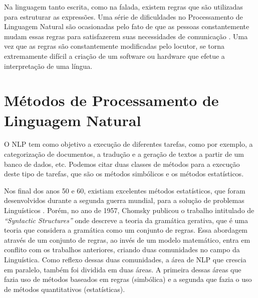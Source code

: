 Na linguagem tanto escrita, como na falada, existem regras que são utilizadas
para estruturar as expressões. Uma série de dificuldades no Processamento de
Linguagem Natural são ocasionadas pelo fato de que as pessoas constantemente
mudam essas regras para satisfazerem suas necessidades de comunicação
\cite{manningschutze1999}. Uma vez que as regras são constantemente modificadas
pelo locutor, se torna extremamente difícil a criação de um software ou hardware
que efetue a interpretação de uma língua.


%
%
%

\section{Métodos de Processamento de Linguagem Natural}

O \ac{NLP} tem como objetivo a execução de diferentes tarefas, como por exemplo,
a categorização de documentos, a tradução e a geração de textos a partir de um
banco de dados, etc. Podemos citar duas classes de métodos para a execução deste
tipo de tarefas, que são os métodos simbólicos e os métodos estatísticos.

Nos final dos anos 50 e 60, existiam excelentes métodos estatísticos, que foram
desenvolvidos durante a segunda guerra mundial, para a solução de problemas
Linguísticos \cite{shannon48}.
Porém, no ano de 1957, Chomsky publicou o trabalho intitulado de
\textit{``Syntactic Structures''} onde descreve a
teoria da gramática gerativa, que é uma teoria que considera a
gramática como um conjunto de regras. Essa abordagem através de um conjunto de
regras, ao invés de um modelo matemático, entra em conflito com os trabalhos
anteriores, criando duas comunidades no campo da Linguística. Como reflexo
dessas duas comunidades, a área de \ac{NLP} que crescia em paralelo, também foi
dividida em duas áreas. A primeira dessas áreas que fazia uso de métodos
baseados em regras (simbólica) e a segunda que fazia o uso de métodos quantitativos (estatísticas).


